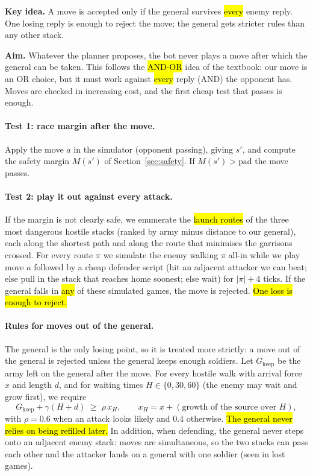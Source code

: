 \begin{keyidea}
\textbf{Key idea.} A move is accepted only if the general survives \hl{every} enemy reply. One losing reply is
enough to reject the move; the general gets stricter rules than any other stack.
\end{keyidea}

\textbf{Aim.} Whatever the planner proposes, the bot never plays a move after which the general can be taken.
This follows the \hl{AND-OR} idea of the textbook: our move is an OR choice, but it must work against
\hl{every} reply (AND) the opponent has. Moves are checked in increasing cost, and the first cheap test that
passes is enough.

\paragraph{Test 1: race margin after the move.} Apply the move $a$ in the simulator (opponent passing),
giving $s'$, and compute the safety margin $M(s')$ of Section~\ref{sec:safety}. If $M(s')>\text{pad}$ the move
passes.

\paragraph{Test 2: play it out against every attack.} If the margin is not clearly safe, we enumerate the
\hl{launch routes} of the three most dangerous hostile stacks (ranked by army minus distance to our general),
each along the shortest path and along the route that minimises the garrisons crossed. For every route $\pi$
we simulate the enemy walking $\pi$ all-in while we play move $a$ followed by a cheap defender script (hit an
adjacent attacker we can beat; else pull in the stack that reaches home soonest; else wait) for $|\pi|+4$
ticks. If the general falls in \hl{any} of these simulated games, the move is rejected. \hl{One loss is enough
to reject.}

\paragraph{Rules for moves out of the general.} The general is the only losing point, so it is treated more
strictly: a move out of the general is rejected unless the general keeps enough soldiers. Let $G_{\text{keep}}$
be the army left on the general after the move. For every hostile walk with arrival force $x$ and length $d$,
and for waiting times $H\in\{0,30,60\}$ (the enemy may wait and grow first), we require
\begin{equation}
G_{\text{keep}}+\gamma(H+d)\;\ge\;\rho\,x_H,\qquad x_H=x+(\text{growth of the source over }H),
\end{equation}
with $\rho=0.6$ when an attack looks likely and $0.4$ otherwise. \hl{The general never relies on being
refilled later.} In addition, when defending, the general never steps onto an adjacent enemy stack: moves are simultaneous,
so the two stacks can pass each other and the attacker lands on a general with one soldier (seen in lost
games).

